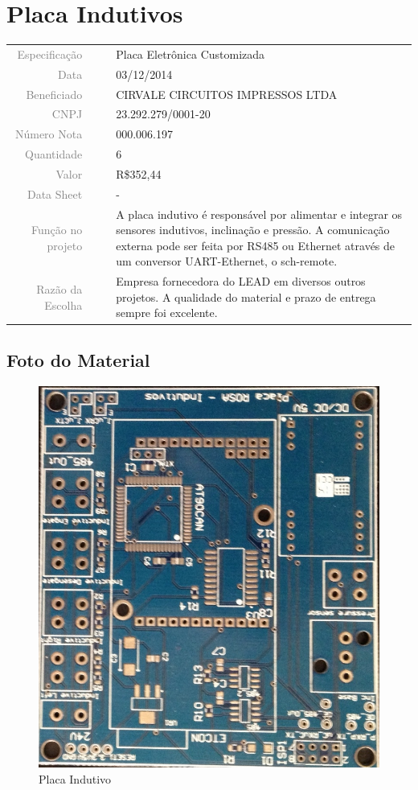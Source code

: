 

\section{Placa Indutivos}
\label{placa_01}


\begin{table}[ht!]

	\begin{tabular}{r l|l p{12cm} }
		
		\textcolor{gray}{Especificação} &&& 	{Placa Eletrônica Customizada}\\
		\textcolor{gray}{Data} &&& 				{03/12/2014}\\
        \textcolor{gray}{Beneficiado} &&&		{CIRVALE CIRCUITOS IMPRESSOS LTDA}
        \\
        \textcolor{gray}{CNPJ} &&& 				{23.292.279/0001-20} \\
        \textcolor{gray}{Número Nota} &&& 		{000.006.197} \\
		\textcolor{gray}{Quantidade} &&& 		{6} \\
		\textcolor{gray}{Valor} &&& 			{R\$352,44} \\
		\textcolor{gray}{Data Sheet} &&& 		{-} \\

		\textcolor{gray}{Função no projeto} &&& {A placa indutivo é responsável por
		alimentar e integrar os sensores indutivos, inclinação e pressão. A
		comunicação externa pode ser feita por RS485 ou Ethernet através de um
		conversor UART-Ethernet, o sch-remote.}
		\\
		\textcolor{gray}{Razão da Escolha} &&& {Empresa fornecedora do LEAD em
		diversos outros projetos. A qualidade do material e prazo de entrega sempre
		foi excelente.}

	\end{tabular}
\end{table}

\newpage
\subsection{Foto do Material}
\begin{figure}[H]
 \centering
 \includegraphics[width=0.5\columnwidth]{Placa/foto.jpg}
 \caption{Placa Indutivo}
\end{figure}

